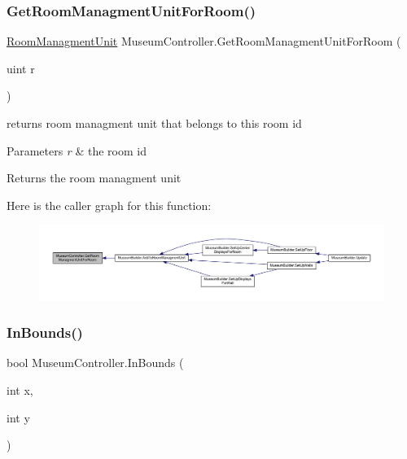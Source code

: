 \subsubsection{\texorpdfstring{Get\+Room\+Managment\+Unit\+For\+Room()}{GetRoomManagmentUnitForRoom()}}
{\footnotesize\ttfamily \mbox{\hyperlink{class_room_managment_unit}{Room\+Managment\+Unit}} Museum\+Controller.\+Get\+Room\+Managment\+Unit\+For\+Room (\begin{DoxyParamCaption}\item[{uint}]{r }\end{DoxyParamCaption})}



returns room managment unit that belongs to this room id 


\begin{DoxyParams}{Parameters}
{\em r} & the room id\\
\hline
\end{DoxyParams}
\begin{DoxyReturn}{Returns}
the room managment unit
\end{DoxyReturn}
Here is the caller graph for this function\+:
\nopagebreak
\begin{figure}[H]
\begin{center}
\leavevmode
\includegraphics[width=350pt]{class_museum_controller_a430d02fd399da5cea23a02f4b9269418_icgraph}
\end{center}
\end{figure}
\mbox{\label{class_museum_controller_a5b242d5604840f35efb90e4b645829fe}} 
\subsubsection{\texorpdfstring{In\+Bounds()}{InBounds()}}
{\footnotesize\ttfamily bool Museum\+Controller.\+In\+Bounds (\begin{DoxyParamCaption}\item[{int}]{x,  }\item[{int}]{y }\end{DoxyParamCaption})\hspace{0.3cm}{\ttfamily [private]}}




